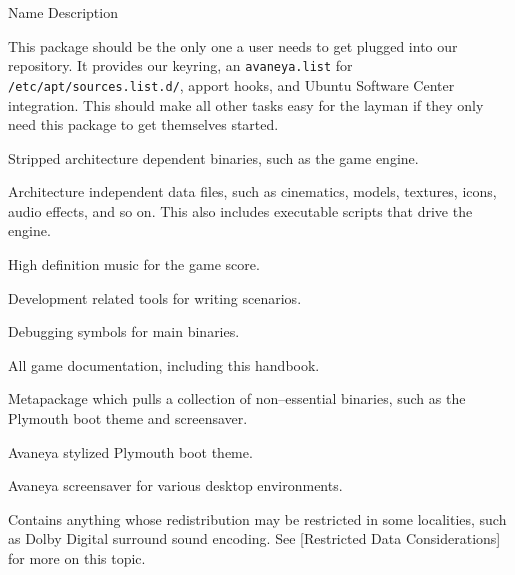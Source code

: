 {
    \bTABLE[split=repeat,option=stretch]
    \setupTABLE[column][2]
        [width=.65\textwidth,
        align=yes]
    \setupTABLE[row][each][align=center]
    \setupTABLE[7][1][align=center]

\bTABLEhead
    \bTR[bottomframe=on]
      \bTH  Name \eTH
      \bTH  Description \eTH
    \eTR
\eTABLEhead

\bTABLEbody
    \bTR
       \eTC
      \bTC This package should be the only one a user needs to get plugged into our repository. It provides our keyring, an {\tt avaneya.list} for {\tt /etc/apt/sources.list.d/}, apport hooks, and Ubuntu Software Center integration. This should make all other tasks easy for the layman if they only need this package to get themselves started. \eTC
    \eTR


    \bTR
       \eTC
      \bTC Stripped architecture dependent binaries, such as the game engine. \eTC
    \eTR

    \bTR
       \eTC
      \bTC Architecture independent data files, such as cinematics, models, 
textures, icons, audio effects, and so on. This also includes executable scripts 
that drive the engine. \eTC
    \eTR

    \bTR
       \eTC
      \bTC High definition music for the game score. \eTC
    \eTR

    \bTR
       \eTC
      \bTC Development related tools for writing scenarios. \eTC
    \eTR

    \bTR
       \eTC
      \bTC Debugging symbols for main binaries. \eTC
    \eTR

    \bTR
       \eTC
      \bTC All game documentation, including this handbook. \eTC
    \eTR

    \bTR
       \eTC
      \bTC Metapackage which pulls a collection of non--essential binaries, such as the Plymouth boot theme and screensaver. \eTC
    \eTR

    \bTR
       \eTC
      \bTC Avaneya stylized Plymouth boot theme. \eTC
    \eTR
    
    \bTR
       \eTC
      \bTC Avaneya screensaver for various desktop environments. \eTC
    \eTR

    \bTR
       \eTC
      \bTC Contains anything whose redistribution may be restricted in some localities, such as Dolby Digital surround sound encoding. See [Restricted Data Considerations] for more on this topic. \eTC
    \eTR
\eTABLEbody
\eTABLE
}

